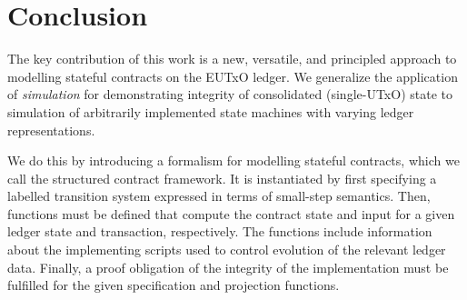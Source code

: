 %


\section{Conclusion}
\label{sec:conclusion}

%

The key contribution of this work is a new, versatile, and principled approach to
modelling stateful contracts on the EUTxO ledger. We generalize the application of
\emph{simulation} for demonstrating integrity of consolidated (single-UTxO) state \cite{eutxoma}
to simulation of arbitrarily implemented state machines with varying ledger
representations.

We do this by introducing a formalism for modelling stateful contracts, which
we call the structured contract framework.
It is instantiated by first specifying a labelled transition system expressed in terms of
small-step semantics. Then, functions must be defined that compute the contract state
and input for a given ledger state and transaction, respectively. The functions include
information about the implementing scripts used to control evolution of the relevant ledger
data. Finally, a proof
obligation of the integrity of the implementation must be fulfilled for the given specification
and projection functions.

